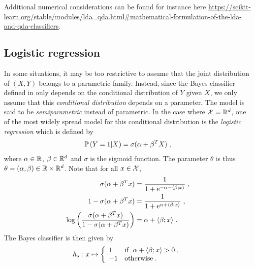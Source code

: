 Additional numerical considerations can be found for instance here \url{https://scikit-learn.org/stable/modules/lda_qda.html#mathematical-formulation-of-the-lda-and-qda-classifiers}.


\subsection{Logistic regression}
\label{regression!logistic}

In some situations, it may be too restrictive to assume that the joint distribution of $(X,Y)$ belongs to a parametric family. Instead, since the Bayes classifier defined in  only depends on the conditional distribution of $Y$ given $X$, we only assume that this {\em conditional distribution} depends on a parameter. The model is said to be  {\em semiparametric} instead of parametric. In the case where $\mathcal{X} = \mathbb{R}^d$, one of the most widely spread model for this conditional distribution is the {\em logistic regression} which is defined by
\begin{equation}
\label{eq:prob:logistic}
\mathbb{P}\left(Y=1\middle |X\right) = \sigma(\alpha + \beta^TX)\;,
\end{equation}
where $\alpha\in\mathbb{R}$, $\beta\in\mathbb{R}^d$ and $\sigma$ is the sigmoid function.
The parameter $\theta$ is thus $\theta=(\alpha,\beta) \in \mathbb{R} \times \mathbb{R}^d$.
Note that for all $x\in\mathcal{X}$,
\begin{align*}
\sigma(\alpha + \beta^Tx) &= \frac{1}{1+\mathrm{e}^{-\alpha - \langle \beta;x\rangle}}\;, \\
1- \sigma(\alpha + \beta^Tx) &= \frac{1}{1+\mathrm{e}^{\alpha + \langle \beta;x\rangle}}\;,\\
\log\left(\frac{\sigma(\alpha + \beta^Tx)}{1-\sigma(\alpha + \beta^Tx)}\right) &= \alpha + \langle \beta;x\rangle\;.
\end{align*}
The Bayes classifier is then given by
\[
h_{\star}: x\mapsto  \left\{
    \begin{array}{ll}
       1 & \mbox{if }\; \alpha + \langle \beta;x\rangle>0\;, \\
        -1 & \mbox{otherwise}\;.
    \end{array}
\right.
\]


